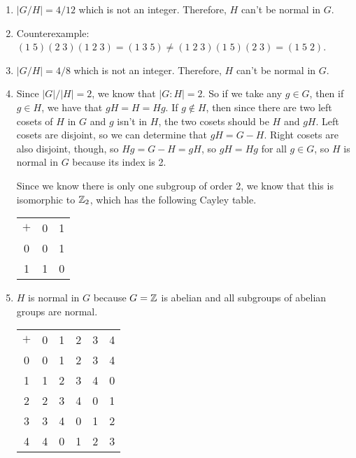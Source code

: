 \documentclass[12pt]{report}
\begin{document}
\sol
\begin{enumerate}[label=\alph*.]
    \item $|G/H| = 4/12$ which is not an integer. Therefore, $H$ can't be normal in $G$.
    \item Counterexample: $(1 \; 5)(2 \; 3)(1 \; 2 \; 3) = (1 \; 3 \; 5) \neq (1 \; 2 \; 3)(1 \; 5)(2 \; 3) = (1 \; 5 \; 2)$. 
    \item $|G/H| = 4/8$ which is not an integer. Therefore, $H$ can't be normal in $G$.
    \item Since $|G| / |H| = 2$, we know that $|G:H| = 2$. So if we take any $g \in G$, then if $g \in H$, we have that $gH = H = Hg$. If $g \not\in H$, then since there are  two left cosets of $H$ in $G$ and $g$ isn't in $H$, the two cosets should be $H$ and $gH$. Left cosets are disjoint, so we can determine that $gH = G - H$. Right cosets are also disjoint, though, so $Hg = G-H = gH$, so $gH = Hg$ for all $g \in G$, so $H$ is normal in $G$ because its index is 2. 
    
    Since we know there is only one subgroup of order 2, we know that this is isomorphic to $\ZZ_2$, which has the following Cayley table.
    \begin{center}
        \noindent\begin{tabular}{c | c c}
        $+$ & 0 & 1  \\
        \cline{1-3}
        0 & 0 & 1 \\
        1 & 1 & 0
        \end{tabular}
    \end{center}
    \item $H$ is normal in $G$ because $G = \ZZ$ is abelian and all subgroups of abelian groups are normal. 
    \begin{center}
        \noindent\begin{tabular}{c | c c c c c}
        $+$ & 0 & 1 & 2 & 3 & 4  \\
        \cline{1-6}
        0 & 0 & 1 & 2 & 3 & 4 \\
        1 & 1 & 2 & 3 & 4 & 0\\
        2 & 2 & 3 & 4 & 0 & 1 \\
        3 & 3 & 4 & 0 & 1 & 2\\
        4 & 4 & 0 & 1 & 2 & 3\\
        \end{tabular}
    \end{center}
\end{enumerate}
\end{document}
